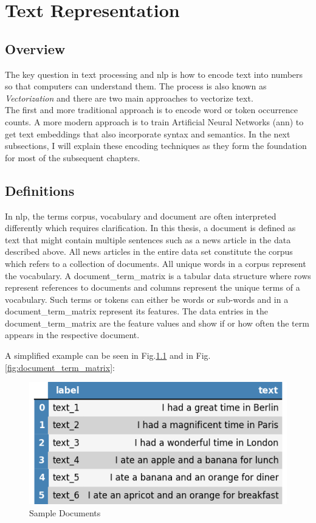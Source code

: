 \chapter{Text Representation}\label{ch:text-representation}

\section{Overview}\label{sec:overview_text_representation}
The key question in text processing and \gls{nlp} is how to encode text into numbers so that computers can understand them.
The process is also known as \emph{Vectorization} \cite{word2vec2} and there are two main approaches to vectorize text.\\
The first and more traditional approach is to encode word or \gls{token} occurrence counts.
A more modern approach is to train Artificial Neural Networks (\gls{ann}) to get text embeddings that also incorporate syntax and semantics.
In the next subsections, I will explain these encoding techniques as they form the foundation for most of the subsequent chapters.


\section{Definitions}\label{sec:definitions}
In \gls{nlp}, the terms \gls{corpus}, \gls{vocabulary} and \gls{document} are often interpreted differently which requires clarification.
In this thesis, a \gls{document} is defined as text that might contain multiple sentences such as a news article in the data described above.
All news articles in the entire data set constitute the \gls{corpus} which refers to a collection of documents.
All unique words in a \gls{corpus} represent the \gls{vocabulary}.
A \gls{document_term_matrix} is a tabular data structure where rows represent references to documents and columns represent the unique terms of a vocabulary.
Such terms or \glspl{token} can either be words or sub-words and in a \gls{document_term_matrix} represent its features.
The data entries in the \gls{document_term_matrix} are the feature values and show if or how often the term appears in the respective document.

A simplified example can be seen in Fig.\ref{fig:sample_docs} and in Fig.\ref{fig:document_term_matrix}:

\begin{figure}[H]
    \centering
    \includegraphics[keepaspectratio=true,scale=0.6]{Assets/topic_model_text}
    \caption{Sample Documents}
    \label{fig:sample_docs}
\end{figure}

